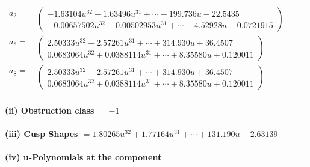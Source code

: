 \documentclass[1p]{elsarticle_modified}
\theoremstyle{definition}
\begin{document}
\begin{tabular}{m{7pt} m{180pt} m{7pt} m{180pt} }
\flushright $a_{2}=$&$\begin{pmatrix}-1.63104 u^{32}-1.63496 u^{31}+\cdots-199.736 u-22.5435\\-0.00657502 u^{32}-0.00502953 u^{31}+\cdots-4.52928 u-0.0721915\end{pmatrix}$ \\
\flushright $a_{8}=$&$\begin{pmatrix}2.50333 u^{32}+2.57261 u^{31}+\cdots+314.930 u+36.4507\\0.0683064 u^{32}+0.0388114 u^{31}+\cdots+8.35580 u+0.120011\end{pmatrix}$\\ \flushright $a_{8}=$&$\begin{pmatrix}2.50333 u^{32}+2.57261 u^{31}+\cdots+314.930 u+36.4507\\0.0683064 u^{32}+0.0388114 u^{31}+\cdots+8.35580 u+0.120011\end{pmatrix}$\\&\end{tabular}
\flushleft \textbf{(ii) Obstruction class $= -1$}\\~\\
\flushleft \textbf{(iii) Cusp Shapes $= 1.80265 u^{32}+1.77164 u^{31}+\cdots+131.190 u-2.63139$}\\~\\
\newpage\renewcommand{\arraystretch}{1}
\flushleft \textbf{(iv) u-Polynomials at the component}\newline \\
\end{document}
